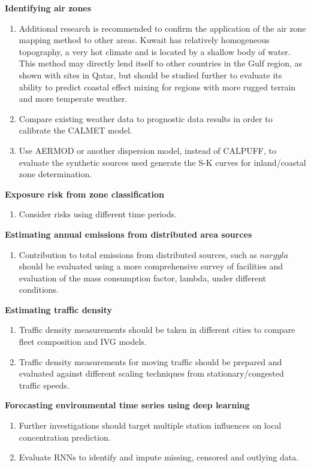 \noindent
\textbf{Identifying air zones}
\begin{enumerate}

\item Additional research is recommended to confirm the application of the air zone mapping method to other areas.  Kuwait has relatively homogeneous topography, a very hot climate and is located by a shallow body of water.  This method may directly lend itself to other countries in the Gulf region, as shown with sites in Qatar, but should be studied further to evaluate its ability to predict coastal effect mixing for regions with more rugged terrain and more temperate weather.

\item Compare existing weather data to prognostic data results in order to calibrate the CALMET model.

\item Use AERMOD or another dispersion model, instead of CALPUFF, to evaluate the synthetic sources used generate the S-K curves for inland/coastal zone determination.
\end{enumerate}

\noindent
\textbf{Exposure risk from zone classification}
\begin{enumerate}
\item Consider risks using different time periods.
\end{enumerate}

\noindent
\textbf{Estimating annual emissions from distributed area sources}
\begin{enumerate}
\item Contribution to total emissions from distributed sources, such as $nargyla$ should be evaluated using a more comprehensive survey of facilities and evaluation of the mass consumption factor, lambda, under different conditions. 
\end{enumerate}

\noindent
\textbf{Estimating traffic density}
\begin{enumerate}
\item Traffic density measurements should be taken in different cities to compare fleet composition and IVG models. 

\item Traffic density measurements for moving traffic should be prepared and evaluated against different scaling techniques from stationary/congested traffic speeds.
\end{enumerate}

\noindent
\textbf{Forecasting environmental time series using deep learning}
\begin{enumerate}
\item Further investigations should target multiple station influences on local concentration prediction.

\item Evaluate RNNs to identify and impute missing, censored and outlying data. 

\end{enumerate}


